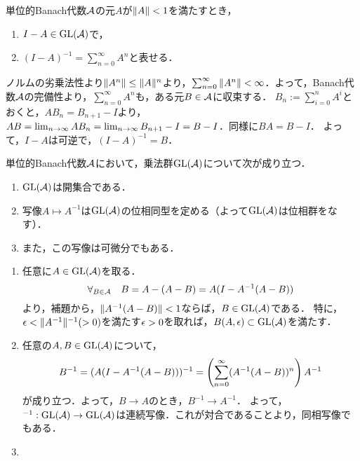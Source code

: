 \documentclass[uplatex,dvipdfmx]{jsreport}
\begin{document}
\begin{lemma}\label{lemma-Neumann-series}
    単位的Banach代数$\mathcal{A}$の元$A$が$\|A\|<1$を満たすとき，
    \begin{enumerate}
        \item $I-A\in\mathrm{GL}(\mathcal{A})$で，
        \item $(I-A)^{-1}=\sum^\infty_{n=0}A^n$と表せる．
    \end{enumerate}
\end{lemma}
\begin{Proof}
    ノルムの劣乗法性より$\|A^n\|\le\|A\|^n$より，$\sum_{n=0}^\infty\|A^n\|<\infty$．よって，Banach代数$\mathcal{A}$の完備性より，$\sum_{n=0}^{\infty}A^n$も，ある元$B\in\mathcal{A}$に収束する．
    $B_n:=\sum_{i=0}^nA^i$とおくと，$AB_n=B_{n+1}-I$より，$AB=\lim_{n\to\infty}AB_n=\lim_{n\to\infty} B_{n+1}-I=B-I$．同様に$BA=B-I$．
    よって，$I-A$は可逆で，$(I-A)^{-1}=B$．
\end{Proof}

\begin{proposition}\label{prop-GA-is-open-in-Banach-algebra}
    単位的Banach代数$\mathcal{A}$において，乗法群$\mathrm{GL}(\mathcal{A})$について次が成り立つ．
    \begin{enumerate}
        \item $\mathrm{GL}(\mathcal{A})$は開集合である．
        \item 写像$A\mapsto A^{-1}$は$\mathrm{GL}(\mathcal{A})$の位相同型を定める（よって$\mathrm{GL}(\mathcal{A})$は位相群をなす）．
        \item また，この写像は可微分でもある．
    \end{enumerate}
\end{proposition}
\begin{Proof}\mbox{}
    \begin{enumerate}
        \item 任意に$A\in\mathrm{GL}(\mathcal{A})$を取る．
        \[\forall_{B\in\mathcal{A}}\quad B=A-(A-B)=A(I-A^{-1}(A-B))\]
        より，補題から，$\|A^{-1}(A-B)\|<1$ならば，$B\in\mathrm{GL}(\mathcal{A})$である．
        特に，$\epsilon<\|A^{-1}\|^{-1}(>0)$を満たす$\epsilon>0$を取れば，$B(A,\epsilon)\subset\mathrm{GL}(\mathcal{A})$を満たす．
        \item 任意の$A,B\in\mathrm{GL}(\mathcal{A})$について，
        \[B^{-1}=(A(I-A^{-1}(A-B)))^{-1}=\left(\sum^\infty_{n=0}(A^{-1}(A-B))^n\right)A^{-1}\]
        が成り立つ．よって，$B\to A$のとき，$B^{-1}\to A^{-1}$．
        よって，${}^{-1}:\mathrm{GL}(\mathcal{A})\to\mathrm{GL}(\mathcal{A})$は連続写像．これが対合であることより，同相写像でもある．
        \item \cite{Murphy}
    \end{enumerate}
\end{Proof}
\end{document}

